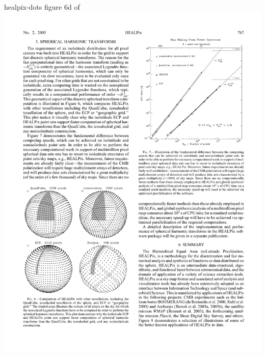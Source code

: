 \documentclass[portrait]{a0poster}
\begin{document}
\begin{staticcontents*}{healpix-dots}
\large\centering
figure 6d of~\citet{healpix}\\\vspace{5mm}
\includegraphics[width=\textwidth]{healpix-dots}
\end{staticcontents*}
\end{document}
